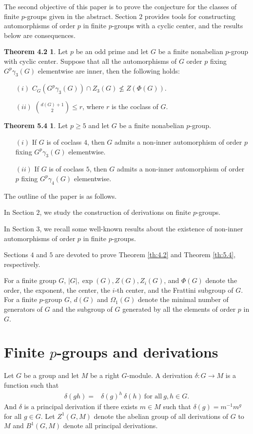 \documentclass[preprint,sort&compress,12pt]{elsarticle}
\theoremstyle{definition}
\newtheorem*{th42}{Theorem 4.2}
\newtheorem*{th54}{Theorem 5.4}
\numberwithin{equation}{theorem}
\begin{document}
The second objective of this paper is to prove the conjecture for the classes of finite $p$-groups given in the abstract. Section $2$ provides tools for constructing automorphisms of order $p$ in finite $p$-groups with a cyclic center, and the results below are consequences.

\begin{th42}
Let $p$ be an odd prime and let $G$ be a finite nonabelian $p$-group with cyclic center. Suppose that all the automorphisms of $G$ order $p$ fixing $G^p\gamma_3(G)$ elementwise are inner, then the following holds:
\begin{itemize} 
\item [$(i)$] $C_G(G^p\gamma_3(G))\cap Z_3(G)\not\le Z(\Phi(G))$.
\item [$(ii)$] ${{d(G)+1}\choose{2}}\le r$, where $r$ is the coclass of $G$.
\end{itemize}
\end{th42}

\begin{th54}
Let $p\ge 5$ and let $G$ be a finite nonabelian $p$-group.
\begin{itemize}
\item [$(i)$] If $G$ is of coclass $4$, then $G$ admits a non-inner automorphism of order $p$ fixing $G^p\gamma_3(G)$ elementwise.
\item [$(ii)$] If $G$ is of coclass $5$, then $G$ admits a non-inner automorphism of order $p$ fixing $G^p\gamma_4(G)$ elementwise.
\end{itemize}
\end{th54}

The outline of the paper is as follows.

In Section $2$, we study the construction of derivations on finite $p$-groups. 

In Section $3$, we recall some well-known results about the existence of non-inner automorphisms of order $p$ in finite $p$-groups. 
 
Sections $4$ and $5$ are devoted to prove Theorem \ref{th:4.2} and Theorem \ref{th:5.4}, respectively. 

For a finite group $G$, $|G|, \exp(G), Z(G), Z_i(G)$, and $\Phi(G)$ denote the order, the exponent, the center, the $i$-th center, and the Frattini subgroup of $G$. For a finite $p$-group $G$, $d(G)$ and $\Omega_1(G)$ denote the minimal number of generators of $G$ and the subgroup of $G$ generated by all the elements of order $p$ in $G$. 

\section{Finite $p$-groups and derivations}
Let $G$ be a group and let $M$ be a right $G$-module. A derivation $\delta:G\rightarrow M$ is a function such that
\begin{align*}
\delta(gh)=& \delta(g)^h\ \delta(h)\ \text{for\ all}\ g, h\in G.
\end{align*}
\noindent And $\delta$ is a principal derivation if there exists $m\in M$ such that $\delta(g)= m^{-1} m^g$ for all $g\in G$. Let $Z^1(G, M)$ denote the abelian group of all derivations of $G$ to $M$ and $B^1(G, M)$ denote all principal derivations.
\end{document}
